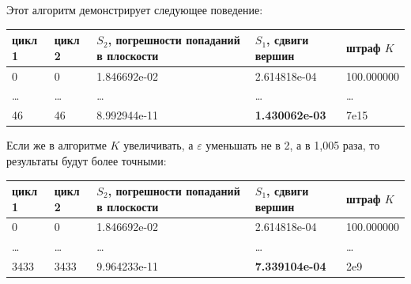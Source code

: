 \documentclass[a4paper,12pt, titlepage]{article}
\begin{document}
\begin{flushleft}
Этот алгоритм демонстрирует следующее поведение:\\
\begin{tabular}{|p{1cm}|p{1cm}|p{4cm}|p{4cm}|p{3cm}|}

\hline 
 цикл 1 & цикл 2 & $S_{2}$, погрешности попаданий в плоскости & $S_{1}$, сдвиги вершин& штраф $K$ \\

\hline
 0 & 0 & 1.846692e-02 & 2.614818e-04 & 100.000000\\
\hline
 \ldots & \ldots & \ldots & \ldots & \ldots \\
\hline
 46 & 46 & 8.992944e-11 & \textbf{1.430062e-03} & 7e15\\
\hline
\end{tabular}
\end{flushleft}

\begin{flushleft}
Если же в алгоритме $K$ увеличивать, а $\varepsilon$ уменьшать не в 2, а в 1,005 раза,
то результаты будут более точными:\\
\begin{tabular}{|p{1cm}|p{1cm}|p{4cm}|p{4cm}|p{3cm}|}

\hline 
 цикл 1 & цикл 2 & $S_{2}$, погрешности попаданий в плоскости & $S_{1}$, сдвиги вершин& штраф $K$ \\

\hline
 0 & 0 & 1.846692e-02 & 2.614818e-04 & 100.000000\\
\hline
 \ldots & \ldots & \ldots & \ldots & \ldots \\
\hline
 3433 & 3433 & 9.964233e-11 & \textbf{7.339104e-04} & 2e9\\
\hline
\end{tabular}
\end{flushleft}
\end{document}
